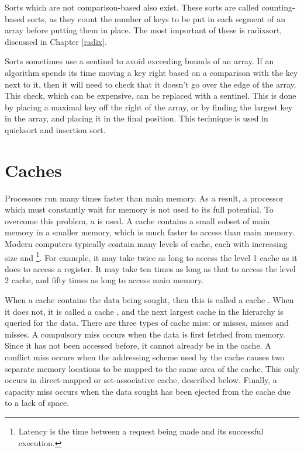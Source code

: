 Sorts which are not comparison-based also exist. These sorts are called
counting-based sorts, as they count the number of keys to be put in each segment
of an array before putting them in place. The most important of these is
radixsort, discussed in Chapter \ref{radix}.

Sorts sometimes use a sentinel to avoid exceeding bounds of an array. If an
algorithm spends its time moving a key right based on a comparison with the key
next to it, then it will need to check that it doesn't go over the edge of the
array. This check, which can be expensive, can be replaced with a sentinel. This
is done by placing a maximal key off the right of the array, or by finding the
largest key in the array, and placing it in the final position. This technique
is used in quicksort and insertion sort.

\section{Caches}
Processors run many times faster than main memory. As a result, a processor
which must constantly wait for memory is not used to its full potential. To
overcome this problem, a  is used. A cache contains a small
subset of main memory in a smaller memory, which is much faster to access than
main memory. Modern computers typically contain many levels of cache, each with
increasing size and \footnote{Latency is the time between a request
being made and its successful execution.}. For example, it may take twice as
long to access the level 1 cache as it does to access a register. It may take
ten times as long as that to access the level 2 cache, and fifty times as long
to access main memory.

When a cache contains the data being sought, then this is called a cache
. When it does not, it is called a cache , and the next largest
cache in the hierarchy is queried for the data. There are three types of cache
miss:  or  misses,  misses and
 misses. A compulsory miss occurs when the data is first fetched
from memory. Since it has not been accessed before, it cannot already be in the
cache. A conflict miss occurs when the addressing scheme used by the cache
causes two separate memory locations to be mapped to the same area of the cache.
This only occurs in direct-mapped or set-associative cache, described below.
Finally, a capacity miss occurs when the data sought has been ejected from the
cache due to a lack of space.

